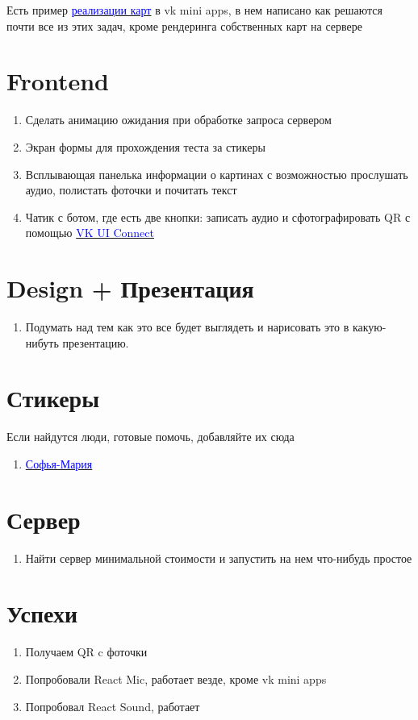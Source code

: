 \documentclass[11pt]{article}
\begin{document}
Есть пример \href{https://vk.com/@clefer-vkapps-api}{\textcolor{blue}{реализации карт}} в vk mini apps, в нем написано как решаются почти все из этих задач, кроме рендеринга собственных карт на сервере

\section{Frontend}
\begin{enumerate}
\item Сделать анимацию ожидания при обработке запроса сервером 

\item  Экран формы для прохождения теста за стикеры

\item Всплывающая панелька информации о картинах с возможностью прослушать аудио, полистать фоточки и почитать текст

\item Чатик с ботом, где есть две кнопки:  записать аудио и сфотографировать QR с помощью  \href{https://vk.com/dev/vk_apps_docs}{\textcolor{blue}{VK UI Connect}}
\end{enumerate}
\section{Design + Презентация}
\begin{enumerate}

\item  Подумать над тем как это все будет выглядеть и нарисовать это в какую-нибуть презентацию.


\end{enumerate}
\section{Стикеры}

Если найдутся люди, готовые помочь,  добавляйте их сюда
\begin{enumerate}

\item \href{https://vk.com/sofiamarid_art}{\textcolor{blue}{Софья-Мария}}

\end{enumerate}
\section{Сервер}

\begin{enumerate}

\item Найти сервер минимальной стоимости и запустить на нем что-нибудь простое 

\end{enumerate}

\section*{Успехи}

\begin{enumerate}
\item Получаем QR c фоточки
\item Попробовали React Mic, работает везде, кроме vk mini apps
\item Попробовал React Sound, работает
\end{enumerate}
 
\end{document}
